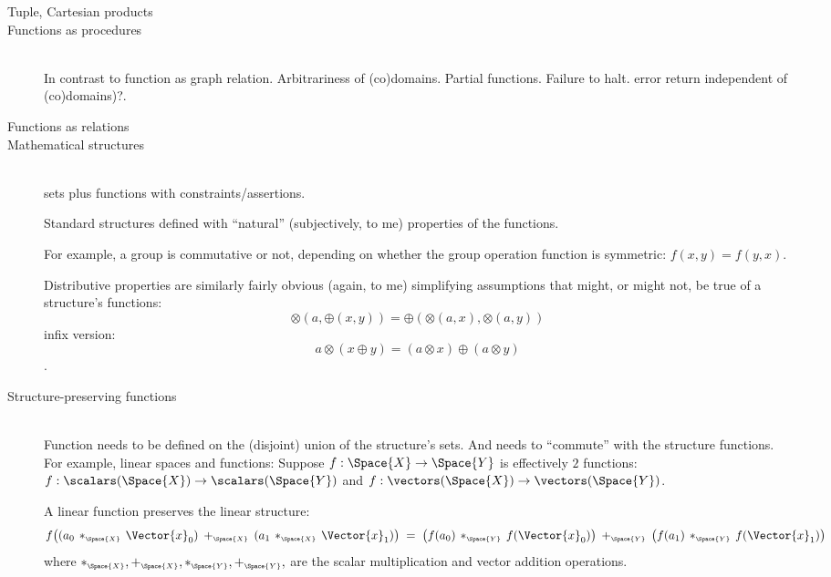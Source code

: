 \documentclass[11pt,openany]{book}
\begin{document}
\begin{description}
\item[Tuple, Cartesian products]%

\item[Functions as procedures]\mbox{}\\
In contrast to function as graph relation.
Arbitrariness of (co)domains. Partial functions. Failure to halt.
error return independent of (co)domains)?.

\item[Functions as relations]%

\item[Mathematical structures]\mbox{}\\
sets plus functions with constraints/assertions.
\par
Standard structures defined with ``natural'' (subjectively, to me)
properties of the functions. 
\par
For example, a group is commutative or not, depending on whether
the group operation function is symmetric: $f(x,y) = f(y,x)$.
\par
Distributive properties are similarly fairly obvious
(again, to me)
simplifying assumptions that might, or might not, be true of
a structure's functions: 
\[
\otimes (a,\oplus (x,y)) = \oplus (\otimes (a,x), \otimes (a,y))
\]
infix version: 
\[
a \otimes (x \oplus y) = (a \otimes x) \oplus (a \otimes y)
\].

\item[Structure-preserving functions]\mbox{}\\
Function needs to be defined on the (disjoint) union of the 
structure's sets.
And needs to ``commute'' with the structure functions.
For example, linear spaces and functions: 
Suppose $f : \Space{X} \rightarrow \Space{Y}$
is effectively $2$ functions:
$f : \scalars(\Space{X}) \rightarrow \scalars(\Space{Y})$ and
$f : \vectors(\Space{X}) \rightarrow \vectors(\Space{Y})$.
 
A linear function preserves the linear structure:
\begin{equation*}
f \big( (a_0 \, *_{\scriptscriptstyle\Space{X}} \, \Vector{x}_0) 
\: +_{\scriptscriptstyle\Space{X}} \: 
(a_1 \, *_{\scriptscriptstyle\Space{X}} \, \Vector{x}_1) \big)
\; = \; 
\big( f(a_0) \, *_{\scriptscriptstyle\Space{Y}} \, f(\Vector{x}_0) \big) 
\: +_{\scriptscriptstyle\Space{Y}} \: 
\big( f(a_1) \, *_{\scriptscriptstyle\Space{Y}} \, f(\Vector{x}_1) \big)
\end{equation*}
where $*_{\scriptscriptstyle\Space{X}}, +_{\scriptscriptstyle\Space{X}}, 
*_{\scriptscriptstyle\Space{Y}}, +_{\scriptscriptstyle\Space{Y}},$
are the scalar multiplication and vector addition operations.
\end{description}
\end{document}
